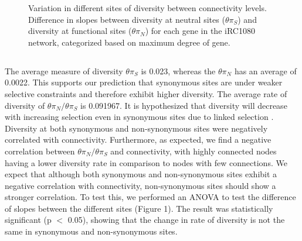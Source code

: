 \documentclass[letterpaper, 10 pt, conference]{ieeeconf}  %
\begin{document}
\begin{figure}[!tbp]
  \centering
  \hfill
  \caption{\fontsize{8}{11}\selectfont Variation in different sites of diversity between connectivity levels. Difference in slopes between diversity at neutral sites ($\theta \pi_S$) and diversity at functional sites ($\theta \pi_N$) for each gene in the iRC1080 network, categorized based on maximum degree of gene.}
\end{figure}

\subsection*{}
The average measure of diversity $\theta \pi_S$ is 0.023, whereas the $\theta \pi_N$ has an average of 0.0022. This supports our prediction that synonymous sites are under weaker selective constraints and therefore exhibit higher diversity. The average rate of diversity of $\theta \pi_N/\theta \pi_S$ is 0.091967. It is hypothesized that diversity will decrease with increasing selection even in synonymous sites due to linked selection \cite{eshsma}. Diversity at both synonymous and non-synonymous sites were negatively correlated with connectivity. Furthermore, as expected, we find a negative correlation between $\theta \pi_N/\theta \pi_S$ and connectivity, with highly connected nodes having a lower diversity rate in comparison to nodes with few connections. We expect that although both synonymous and non-synonymous sites exhibit a negative correlation with connectivity, non-synonymous sites should show a stronger correlation. To test this, we performed an ANOVA to test the difference of slopes between the different sites (Figure 1). The result was statistically significant (p $<$ 0.05), showing that the change in rate of diversity is not the same in synonymous and non-synonymous sites.  
\end{document}
